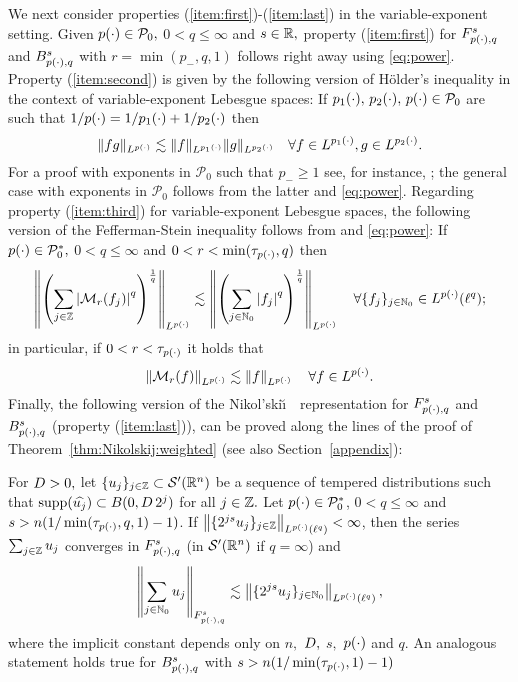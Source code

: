 We next consider properties (\ref{item:first})-(\ref{item:last}) in the variable-exponent setting. Given $\pp\in \mathcal{P}_0,$ $0<q\le\infty$ and $s\in \re,$  property (\ref{item:first}) for $\itl{\pp}{s}{q}$ and $\ibes{\pp}{s}{q}$ with $r=\min(p_-,q,1)$ follows right away using \eqref{eq:power}.  Property (\ref{item:second}) is given by the following version of H\"older's inequality  in the context of variable-exponent Lebesgue spaces: If $\ppo,\, \ppt,\, \pp \in \mathcal{P}_0$ are such that
$ {1}/{\pp} = {1}/{\ppo} + {1}/{\ppt}$ then
\begin{equation*}
 \|fg\|_{L^\pp} \lesssim \|f\|_{L^\ppo}\|g\|_{L^\ppt}\quad \forall f\in L^\ppo, g\in L^\ppt.
 \end{equation*}
 For a proof with exponents in $\mathcal{P}_0$ such that $p_-\ge1$ see, for instance,  \cite[Corollary 2.28]{MR3026953}; the general case with exponents in $\mathcal{P}_0$ follows from the latter and \eqref{eq:power}. Regarding property (\ref{item:third}) for  variable-exponent Lebesgue spaces, the following version of the Fefferman-Stein inequality follows from \cite[Section 5.6.8]{MR3026953} and \eqref{eq:power}: If $\pp\in\mathcal{P}_0^*,$  $0<q\le \infty$  and $0<r<\min(\tau_{\pp},q)$ then
\begin{equation*}
\norm{\left(\sum_{j\in\ent} \abs{\M_r(f_j)}^q\right)^{\frac{1}{q}}}{\Lp}\lesssim \norm{\left(\sum_{j\in\na_0} \abs{f_j}^q\right)^{\frac{1}{q}}}{\Lp}\quad \forall \{f_j\}_{j\in \na_0}\in \Lp(\ell^q);
\end{equation*}
in particular, if $0<r<\tau_{\pp}$ it holds that 
\begin{equation*}
\norm{\M_r(f)}{\Lp}\lesssim \norm{f}{\Lp}\quad \forall f\in \Lp.
\end{equation*}
Finally, the following version of the Nikol'ski\u\i$\text{ }$ representation for $\itl{\pp}{s}{q}$ and $\ibes{\pp}{s}{q}$ (property (\ref{item:last})), can be proved along the lines of the proof of Theorem~\ref{thm:Nikolskij:weighted} (see also Section~\ref{appendix}):
\begin{theorem}\label{thm:Nikolskij:variable} For $\A> 0,$ let $\{u_j\}_{j \in \ent} \subset \mathcal{S}'(\rn)$ be a sequence of tempered distributions such that $\supp(\widehat{u_j}) \subset B(0, \A\, 2^j ) $ for all $j \in \ent.$
Let $ \pp\in \mathcal{P}_0^*$, $0 < q \le \infty$ and $s > n(1/\min(\tau_{\pp},q,1)-1)$. If $\norm{\{2^{js} u_j\}_{j\in\ent}}{\Lp(\ell^{q})} < \infty$, then the series $\sum_{j \in \ent} u_j$ converges in $\itl{\pp}{s}{q}$ (in $\swp$ if $q=\infty$) and 
\begin{equation*}
\norm{\sum_{j \in \na_0} u_j}{\itl{\pp}{s}{q}} \lesssim  \norm{\{2^{js} u_j\}_{j\in\na_0}}{L^\pp(\ell^{q})},
\end{equation*}
where the implicit constant depends only on $n,$ $\A,$ $s,$ $\pp$ and  $q.$  An analogous statement holds true for $\ibes{\pp}{s}{q}$ with $s> n(1/\min(\tau_{\pp},1)-1)$
\end{theorem}


